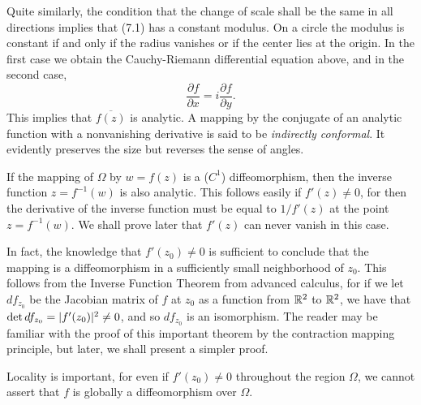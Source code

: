 Quite similarly, the condition that the change of scale shall be the same in all directions implies that (7.1) has a constant modulus. On a circle the modulus is constant if and only if the radius vanishes or if the center lies at the origin. In the first case we obtain the Cauchy-Riemann differential equation above, and in the second case, $$\dfrac{\partial f}{\partial x}=i \dfrac{\partial f}{\partial y}.$$ This implies that $\overline{f(z)}$ is analytic. A mapping by the conjugate of an analytic function with a nonvanishing derivative is said to be \emph{indirectly conformal}. It evidently preserves the size but reverses the sense of angles.

If the mapping of $\Omega$ by $w=f(z)$ is a ($C^1$) diffeomorphism, then the inverse function $z=f^{-1}(w)$ is also analytic. This follows easily if $f'(z) \neq 0$, for then the derivative of the inverse function must be equal to $1/f'(z)$ at the point $z=f^{-1}(w)$. We shall prove later that $f'(z)$ can never vanish in this case.

In fact, the knowledge that $f'(z_0) \neq 0$ is sufficient to conclude that the mapping is a diffeomorphism in a sufficiently small neighborhood of $z_0$. This follows from the Inverse Function Theorem from advanced calculus, for if we let $df_{z_0}$ be the Jacobian matrix of $f$ at $z_0$ as a function from $\mathbb R^2$ to $\mathbb R^2$, we have that $\det df_{z_0}=\lvert f'(z_0) \rvert^2 \neq 0$, and so $df_{z_0}$ is an isomorphism. The reader may be familiar with the proof of this important theorem by the contraction mapping principle, but later, we shall present a simpler proof.

Locality is important, for even if $f'(z_0) \neq 0$ throughout the region $\Omega$, we cannot assert that $f$ is globally a diffeomorphism over $\Omega$.
